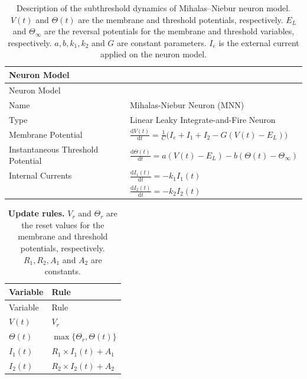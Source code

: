 \documentclass[10pt,a4paper,onecolumn]{article}
\begin{document}
\hypertarget{tbl:2}{}
\begin{longtable}[]{@{}ll@{}}
\caption{\label{tbl:2}Description of the subthreshold dynamics of
Mihalas--Niebur neuron model. \(V(t)\) and \(\Theta(t)\) are the
membrane and threshold potentials, respectively. \(E_L\) and
\(\Theta_{\infty}\) are the reversal potentials for the membrane and
threshold variables, respectively. \(a, b, k_1, k_2\) and \(G\) are
constant parameters. \(I_e\) is the external current applied on the
neuron model. }\tabularnewline
\toprule
Neuron Model &\tabularnewline
\midrule
\endfirsthead
\toprule
Neuron Model &\tabularnewline
\midrule
\endhead
Name & Mihalas-Niebur Neuron (MNN)\tabularnewline
Type & Linear Leaky Integrate-and-Fire Neuron\tabularnewline
Membrane Potential &
\( \frac{\mathrm{d}V(t)}{\mathrm{d}t} = \frac{1}{C} \Big(I_e + I_1 + I_2 - G(V(t) - E_L)  \Big) \)\tabularnewline
Instantaneous Threshold Potential &
\( \frac{\mathrm{d}\Theta(t)}{\mathrm{d}t} = a(V(t) - E_L) - b(\Theta(t) - \Theta_{\infty}) \)\tabularnewline
Internal Currents &
\( \frac{\mathrm{d}I_{1}(t)}{\mathrm{d}t} = -k_1I_1(t) \)\tabularnewline
&
\( \frac{\mathrm{d}I_{2}(t)}{\mathrm{d}t} = -k_2I_2(t) \)\tabularnewline
\bottomrule
\end{longtable}

\pagebreak

\hypertarget{tbl:3}{}
\begin{longtable}[]{@{}ll@{}}
\caption{\label{tbl:3}\textbf{Update rules.} \(V_r\) and \(\Theta_r\)
are the reset values for the membrane and threshold potentials,
respectively. \(R_1, R_2, A_1\) and \(A_2\) are constants.
}\tabularnewline
\toprule
Variable & Rule\tabularnewline
\midrule
\endfirsthead
\toprule
Variable & Rule\tabularnewline
\midrule
\endhead
\(V(t)\) & \(V_r\)\tabularnewline
\(\Theta(t)\) & \(\max\{\Theta_r, \Theta(t) \}\)\tabularnewline
\(I_1(t)\) & \(R_1 \times I_1(t) + A_1\)\tabularnewline
\(I_2(t)\) & \(R_2 \times I_2(t) + A_2\)\tabularnewline
\bottomrule
\end{longtable}
\end{document}
